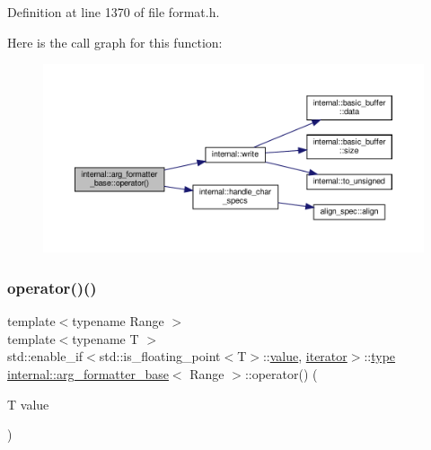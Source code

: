 Definition at line 1370 of file format.\+h.

Here is the call graph for this function\+:
\nopagebreak
\begin{figure}[H]
\begin{center}
\leavevmode
\includegraphics[width=350pt]{classinternal_1_1arg__formatter__base_a7cf58948dafdb66e977cfadb03176de5_cgraph}
\end{center}
\end{figure}
\mbox{\label{classinternal_1_1arg__formatter__base_ad3ecb94ca4a29768ea6b559ee37be3d3}} 
\subsubsection{\texorpdfstring{operator()()}{operator()()}\hspace{0.1cm}{\footnotesize\ttfamily [3/6]}}
{\footnotesize\ttfamily template$<$typename Range $>$ \\
template$<$typename T $>$ \\
std\+::enable\+\_\+if$<$std\+::is\+\_\+floating\+\_\+point$<$T$>$\+::\hyperlink{classinternal_1_1value}{value}, \hyperlink{classinternal_1_1arg__formatter__base_a87622fdc9716fee6a6de2ae496e3a54f}{iterator}$>$\+::\hyperlink{namespaceinternal_a8661864098ac0acff9a6dd7e66f59038}{type} \hyperlink{classinternal_1_1arg__formatter__base}{internal\+::arg\+\_\+formatter\+\_\+base}$<$ Range $>$\+::operator() (\begin{DoxyParamCaption}\item[{T}]{value }\end{DoxyParamCaption})\hspace{0.3cm}{\ttfamily [inline]}}




